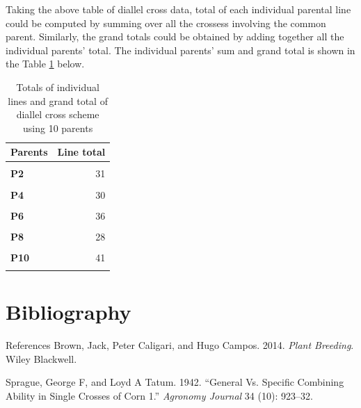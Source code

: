 \documentclass[11pt,dvipsnames,ignorenonframetext,aspectratio=169]{beamer}
\newlength{\cslhangindent}
\newenvironment{cslreferences}%
    {\setlength{\parindent}{0pt}%
    \everypar{\setlength{\hangindent}{\cslhangindent}}\ignorespaces}%
    {\par}
\begin{document}
\begin{frame}{}
\footnotesize

Taking the above table of diallel cross data, total of each individual
parental line could be computed by summing over all the crossess
involving the common parent. Similarly, the grand totals could be
obtained by adding together all the individual parents' total. The
individual parents' sum and grand total is shown in the Table
\ref{tab:sum-over-ind} below.
\end{frame}

\begin{frame}{}
\protect\hypertarget{section-17}{}
\begin{table}

\caption{\label{tab:sum-over-ind}Totals of individual lines and grand total of diallel cross
 scheme using 10 parents}
\centering
\fontsize{8}{10}\selectfont
\begin{tabular}[t]{>{}lr}
\toprule
Parents & Line total\\
\midrule
\textbf{\cellcolor{gray!6}{P1}} & \cellcolor{gray!6}{27}\\
\textbf{P2} & 31\\
\textbf{\cellcolor{gray!6}{P3}} & \cellcolor{gray!6}{15}\\
\textbf{P4} & 30\\
\textbf{\cellcolor{gray!6}{P5}} & \cellcolor{gray!6}{35}\\
\addlinespace
\textbf{P6} & 36\\
\textbf{\cellcolor{gray!6}{P7}} & \cellcolor{gray!6}{32}\\
\textbf{P8} & 28\\
\textbf{\cellcolor{gray!6}{P9}} & \cellcolor{gray!6}{29}\\
\textbf{P10} & 41\\
\addlinespace
\textbf{\cellcolor{gray!6}{Total}} & \cellcolor{gray!6}{303}\\
\bottomrule
\end{tabular}
\end{table}
\end{frame}

\hypertarget{bibliography}{%
\section{Bibliography}\label{bibliography}}

\begin{frame}{References}
\protect\hypertarget{references}{}
\hypertarget{refs}{}
\begin{cslreferences}
\leavevmode\hypertarget{ref-brown2014plantbreeding}{}%
Brown, Jack, Peter Caligari, and Hugo Campos. 2014. \emph{Plant
Breeding}. Wiley Blackwell.

\leavevmode\hypertarget{ref-sprague1942general}{}%
Sprague, George F, and Loyd A Tatum. 1942. ``General Vs. Specific
Combining Ability in Single Crosses of Corn 1.'' \emph{Agronomy Journal}
34 (10): 923--32.
\end{cslreferences}
\end{frame}
\end{document}
